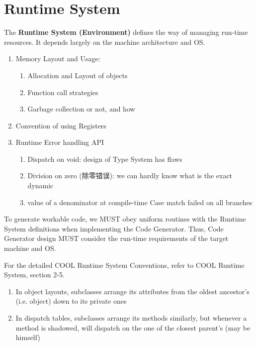 \documentclass[a4paper]{exam}
\theoremstyle{definition}
\begin{document}
\section{Runtime System}
The \textbf{Runtime System (Environment)} defines the way of managing run-time resources. It depends largely on the machine architecture and OS.

\begin{enumerate}
    \item Memory Layout and Usage:
\begin{enumerate}
    \item Allocation and Layout of objects
    \item Function call strategies
    \item Garbage collection or not, and how
\end{enumerate}
\item Convention of using Registers
\item Runtime Error handling API
\begin{enumerate}
    \item Dispatch on void: design of Type System has flaws
\item Division on zero (除零错误): we can hardly know what is the exact dynamic \item value of a denominator at compile-time Case match failed on all branches
\end{enumerate}
\end{enumerate}
To generate workable code, we MUST obey uniform routines with the Runtime System definitions when implementing the Code Generator. Thus, Code Generator design MUST consider the run-time requirements of the target machine and OS.


For the detailed COOL Runtime System Conventions, refer to COOL Runtime System, section 2-5.
\begin{enumerate}
    \item  In object layouts, subclasses arrange its attributes from the oldest ancestor's (i.e. object) down to its private ones
 \item In dispatch tables, subclasses arrange its methods similarly, but whenever a method is shadowed, will dispatch on the one of the closest parent's (may be himself)
\end{enumerate}
\end{document}
